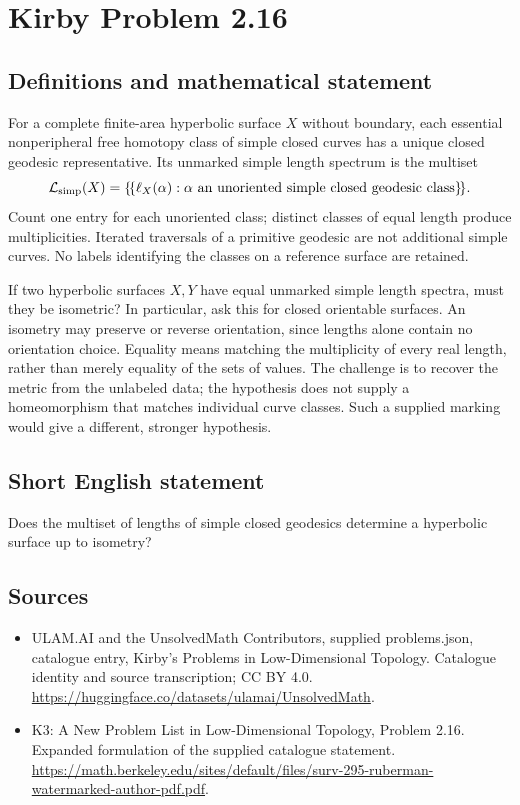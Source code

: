 \documentclass[11pt,a4paper]{article}
\begin{document}
\section*{Kirby Problem 2.16}\label{statement}

\subsection{Definitions and mathematical statement}
For a complete finite-area hyperbolic surface $X$ without boundary, each
essential nonperipheral
free homotopy class of simple closed curves has a unique closed geodesic
representative. Its unmarked simple length spectrum is the multiset
\[
\mathcal L_{\rm simp}(X)=
\{\!\{\ell_X(\alpha):\alpha\text{ an unoriented simple closed
geodesic class}\}\!\}.
\]
Count one entry for each unoriented class; distinct classes of equal length
produce multiplicities. Iterated traversals of a primitive geodesic are not
additional simple curves. No labels identifying the classes on a reference
surface are retained.

If two hyperbolic surfaces $X,Y$ have equal unmarked simple length spectra,
must they be isometric? In particular, ask this for closed orientable surfaces.
An isometry may preserve or reverse orientation, since lengths alone contain no
orientation choice.
Equality means matching the multiplicity of every real length, rather than
merely equality of the sets of values. The challenge is to recover the metric
from the unlabeled data; the hypothesis does not supply a homeomorphism that
matches individual curve classes. Such a supplied marking would give a
different, stronger hypothesis.
\subsection{Short English statement}
Does the multiset of lengths of simple closed geodesics determine a hyperbolic surface up to isometry?
\subsection{Sources}
\begin{itemize}
\item[S1] ULAM.AI and the UnsolvedMath Contributors, supplied problems.json, catalogue entry, Kirby's Problems in Low-Dimensional Topology. Catalogue identity and source transcription; CC BY 4.0.
\url{https://huggingface.co/datasets/ulamai/UnsolvedMath}.
\item[S2] K3: A New Problem List in Low-Dimensional Topology, Problem 2.16. Expanded formulation of the supplied catalogue statement.
\url{https://math.berkeley.edu/sites/default/files/surv-295-ruberman-watermarked-author-pdf.pdf}.
\end{itemize}
\end{document}
